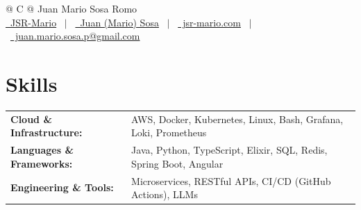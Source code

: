 \documentclass[a4paper,11pt]{article}
\begin{document}
\pagestyle{empty} 



\begin{tabularx}{\linewidth}{@{} C @{}}
\Huge{Juan Mario Sosa Romo} \\[7.5pt]
\href{https://github.com/JSR-Mario}{\raisebox{-0.05\height}\faGithub\ JSR-Mario} \ $|$ \ 
\href{https://www.linkedin.com/in/juan-sosa-997405294/}{\raisebox{-0.05\height}\faLinkedin\
Juan (Mario) Sosa} \ $|$ \ 
\href{https://jsr-mario.com/}{\raisebox{-0.05\height}\faGlobe \ jsr-mario.com} \ $|$ \ 
\href{mailto:juan.mario.sosa.p@gmail.com}{\raisebox{-0.05\height}\faEnvelope \ juan.mario.sosa.p@gmail.com} \\
\end{tabularx}
\vspace{-.5cm}



\section{Skills}
\begin{tabularx}{\linewidth}{@{}l X@{}}
\textbf{Cloud \& Infrastructure:} & AWS, Docker, Kubernetes, Linux, Bash, Grafana, Loki, Prometheus \\
\textbf{Languages \& Frameworks:} & Java, Python, TypeScript, Elixir, SQL, Redis, Spring Boot, Angular \\
\textbf{Engineering \& Tools:} & Microservices, RESTful APIs, CI/CD (GitHub Actions), LLMs
\end{tabularx}
\end{document}
